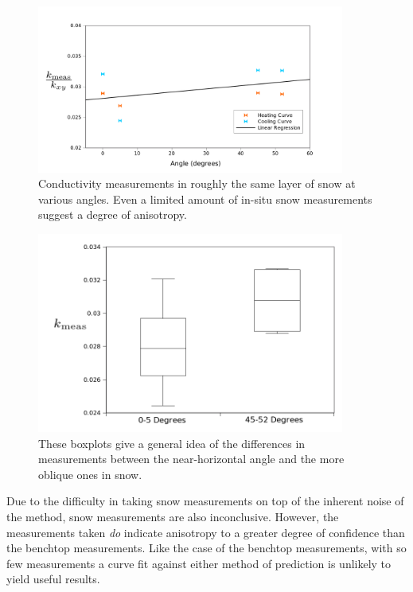 \begin{figure}[h]
\centering
\includegraphics[width=0.9\textwidth]{fig/snow_meas.png}
\caption{Conductivity measurements in roughly the same layer of snow at various 
angles. Even a limited amount of in-situ snow measurements suggest a degree of
anisotropy.}
\label{fig:snow_results}
\end{figure}

\begin{figure}[h]
\centering
\includegraphics[width=0.9\textwidth]{fig/snow_meas_boxplot.png}
\caption{These boxplots give a general idea of the differences in measurements
between the near-horizontal angle and the more oblique ones in snow.}
\label{fig:test_boxplot}
\end{figure}


Due to the difficulty in taking snow measurements on top of the inherent noise
of the method, snow measurements are also inconclusive. However, the
measurements taken \emph{do} indicate anisotropy to a greater degree of confidence
than the benchtop measurements. Like the case of the benchtop measurements, with so few
measurements a curve fit against either method of prediction is unlikely to
yield useful results.
